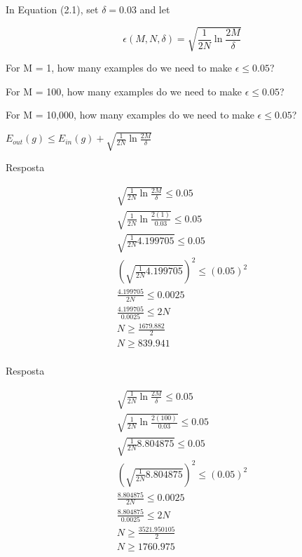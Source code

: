 \begin{enunciado}{1}
    In Equation (2.1), set $\delta = 0.03$ and let
    
    $$ \epsilon(M, N, \delta) = \sqrt{\frac{1}{2N} \ln{\frac{2M}{\delta}}}$$
    
     For M = 1, how many examples do we need to make $\epsilon \le 0.05$?
    
     For M = 100, how many examples do we need to make $\epsilon \le 0.05$?
    
     For M = 10,000, how many examples do we need to make $\epsilon \le 0.05$?
    
    \begin{grayt}
		$ E_{out}(g) \leq E_{in}(g) + \sqrt{\frac{1}{2N} \ln{\frac{2M}{\delta}}} $
    \end{grayt}
    
\end{enunciado}

 Resposta

\begin{align*}
	\sqrt{\frac{1}{2N} \ln{\frac{2M}{\delta}}} \le 0.05 \\
	\sqrt{\frac{1}{2N} \ln{\frac{2(1)}{0.03}}} \le 0.05 \\
	\sqrt{\frac{1}{2N} {4.199705}} \le 0.05 \\
	\left( \sqrt{\frac{1}{2N} {4.199705}} \right) ^ {2} \le (0.05)^{2} \\
	\frac{4.199705}{2N} \le 0.0025 \\
	\frac{4.199705}{0.0025} \le 2N \\
	N \ge \frac{1679.882}{2} \\
	N \ge {839.941} \\
\end{align*}


 Resposta

\begin{align*}
	\sqrt{\frac{1}{2N} \ln{\frac{2M}{\delta}}} \le 0.05 \\
	\sqrt{\frac{1}{2N} \ln{\frac{2(100)}{0.03}}} \le 0.05 \\
	\sqrt{\frac{1}{2N} {8.804875}} \le 0.05 \\
	\left( \sqrt{\frac{1}{2N} {8.804875}} \right) ^ {2} \le (0.05)^{2} \\
	\frac{8.804875}{2N} \le 0.0025 \\
	\frac{8.804875}{0.0025} \le 2N \\
	N \ge \frac{3521.950105}{2} \\
	N \ge {1760.975} \\
\end{align*}


